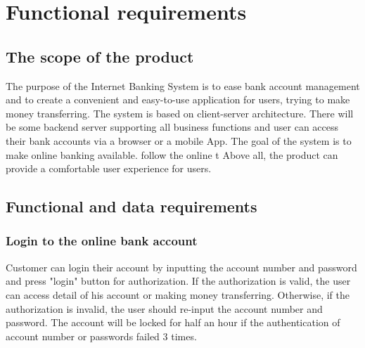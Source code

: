 \documentclass{scrreprt}
\begin{document}


\chapter{Functional requirements}

\section{The scope of the product}
The purpose of the Internet Banking System is to ease bank account management and to create a convenient and easy-to-use application for users, trying to make money transferring. The system is based on client-server architecture. There will be some backend server supporting all business functions and user can access their bank accounts via a browser or a mobile App. The goal of the system is to make online banking available. follow the online t Above all, the product can provide a comfortable user experience for users.

\section{Functional and data requirements}
\subsection{Login to the online bank account}
Customer can login their account by inputting the account number and password and press "login" button for authorization. If the authorization is valid, the user can access detail of his account or making money transferring. Otherwise, if the authorization is invalid, the user should re-input the account number and password. The account will be locked for half an hour if the authentication of account number or passwords failed 3 times.
\end{document}
